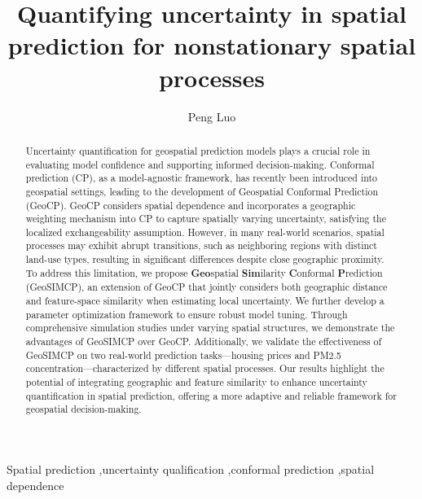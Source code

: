 \documentclass[authoryear,preprint,review,12pt]{elsarticle}
\begin{document}
\begin{frontmatter}
\title{Quantifying uncertainty in spatial prediction for nonstationary spatial processes}

\author[a]{Peng Luo}


\address[a]{Senseable City Lab, Massachusetts Institute of Technology, Cambridge, USA}




\begin{abstract}



Uncertainty quantification for geospatial prediction models plays a crucial role in evaluating model confidence and supporting informed decision-making. Conformal prediction (CP), as a model-agnostic framework, has recently been introduced into geospatial settings, leading to the development of Geospatial Conformal Prediction (GeoCP). GeoCP considers spatial dependence and incorporates a geographic weighting mechanism into CP to capture spatially varying uncertainty, satisfying the localized exchangeability assumption. However, in many real-world scenarios, spatial processes may exhibit abrupt transitions, such as neighboring regions with distinct land-use types, resulting in significant differences despite close geographic proximity. To address this limitation, we propose \textbf{Geo}spatial \textbf{Sim}ilarity \textbf{C}onformal \textbf{P}rediction (GeoSIMCP), an extension of GeoCP that jointly considers both geographic distance and feature-space similarity when estimating local uncertainty. We further develop a parameter optimization framework to ensure robust model tuning. Through comprehensive simulation studies under varying spatial structures, we demonstrate the advantages of GeoSIMCP over GeoCP. Additionally, we validate the effectiveness of GeoSIMCP on two real-world prediction tasks—housing prices and PM2.5 concentration—characterized by different spatial processes. Our results highlight the potential of integrating geographic and feature similarity to enhance uncertainty quantification in spatial prediction, offering a more adaptive and reliable framework for geospatial decision-making.

\end{abstract}

\begin{keyword}
Spatial prediction \sep uncertainty qualification \sep conformal prediction \sep spatial dependence 
\end{keyword}
\end{frontmatter}
\end{document}
